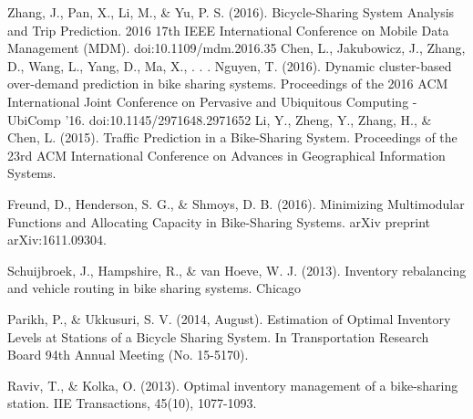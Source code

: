 \documentclass{proc}
\begin{document}
\begin{thebibliography}{2}
  Zhang, J., Pan, X., Li, M., \& Yu, P. S. (2016). Bicycle-Sharing System Analysis and Trip Prediction. 2016 17th IEEE International Conference on Mobile Data Management (MDM). doi:10.1109/mdm.2016.35
Chen, L., Jakubowicz, J., Zhang, D., Wang, L., Yang, D., Ma, X., . . . Nguyen, T. (2016). Dynamic cluster-based over-demand prediction in bike sharing systems. Proceedings of the 2016 ACM International Joint Conference on Pervasive and Ubiquitous Computing - UbiComp '16. doi:10.1145/2971648.2971652
 Li, Y., Zheng, Y., Zhang, H., \& Chen, L. (2015). Traffic Prediction in a Bike-Sharing System. Proceedings of the 23rd ACM International Conference on Advances in Geographical Information Systems.

 Freund, D., Henderson, S. G., \& Shmoys, D. B. (2016). Minimizing Multimodular Functions and Allocating Capacity in Bike-Sharing Systems. arXiv preprint arXiv:1611.09304.

Schuijbroek, J., Hampshire, R., \& van Hoeve, W. J. (2013). Inventory rebalancing and vehicle routing in bike sharing systems.
Chicago	

 Parikh, P., \& Ukkusuri, S. V. (2014, August). Estimation of Optimal Inventory Levels at Stations of a Bicycle Sharing System. In Transportation Research Board 94th Annual Meeting (No. 15-5170).

 Raviv, T., \& Kolka, O. (2013). Optimal inventory management of a bike-sharing station. IIE Transactions, 45(10), 1077-1093.


\end{thebibliography}


\end{document}

